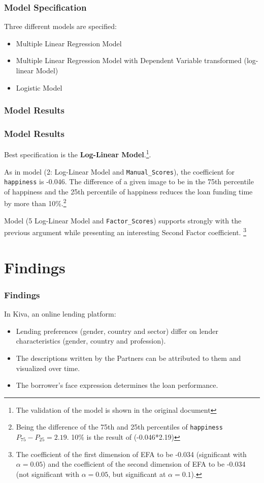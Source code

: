 \documentclass{beamer}
\begin{document}
\begin{frame}\frametitle{Model Specification}
Three different models are specified:
\begin{itemize}
\item Multiple Linear Regression Model
\item Multiple Linear Regression Model with Dependent Variable transformed (log-linear Model)
\item Logistic Model
\end{itemize}
\end{frame}

\begin{frame}[plain]\frametitle{Model Results}

\end{frame}

\begin{frame}\frametitle{Model Results}
Best specification is the \textbf{Log-Linear Model}.\footnote{The validation of the model is shown in the original document}. \par
As in model (2: Log-Linear Model and \texttt{Manual\_Scores}), the coefficient for \texttt{happiness} is -0.046. The difference of a given image to be in the 75th percentile of happiness and the 25th percentile of happiness reduces the loan funding time by more than 10\%.\footnote{Being the difference of the 75th and 25th percentiles of \texttt{happiness} $P_{75}-P_{25}=2.19$. 10\% is the result of (-0.046*2.19)} \par
Model (5 Log-Linear Model and \texttt{Factor\_Scores}) supports strongly with the previous argument while presenting an interesting Second Factor coefficient. \footnote{The coefficient of the first dimension of EFA to be -0.034 (significant with $\alpha=0.05$) and the coefficient of the second dimension of EFA to be -0.034 (not significant with $\alpha=0.05$, but significant at $\alpha=0.1$).} \par
\end{frame}

\section{Findings} 
\begin{frame}\frametitle{Findings}
In Kiva, an online lending platform:
\begin{itemize}
\item Lending preferences (gender, country and sector) differ on lender characteristics (gender, country and profession).
\item The descriptions written by the Partners can be attributed to them and visualized over time.
\item The borrower's face expression determines the loan performance.
\end{itemize}
\end{frame}
\end{document}
